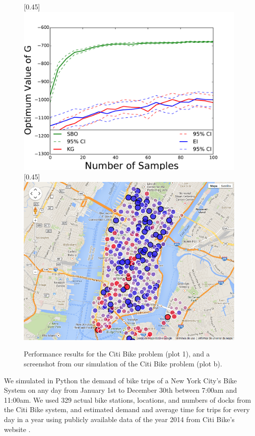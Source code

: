 \documentclass{article}
\begin{document}
\begin{figure}[!htb]
    \centering
    [0.45\linewidth]{
      \includegraphics[width=0.45\linewidth]{comparisonSameConfiguration.pdf}}
          \quad
     [0.45\linewidth]{
      \includegraphics[width=0.45\linewidth]{testStationMapPng0-full.png}}
\caption{Performance results for the Citi Bike problem (plot 1), and a screenshot from our simulation of the Citi Bike problem (plot b).
    \label{fig:stuff}}
\end{figure}


We simulated in Python the demand of bike trips of a New York City's Bike System on any day from January 1st to December 30th between 7:00am and 11:00am. We used 329 actual bike stations, locations, and numbers of docks from the Citi Bike system, and estimated demand and average time for trips for every day in a year using publicly available data of the year 2014 from Citi Bike's website \cite{citibike}.

\end{document}
